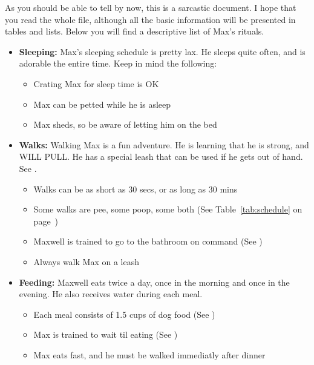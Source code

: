 \documentclass[pdftex,12pt]{article}
\begin{document}
\pagebreak

As you should be able to tell by now, this is a sarcastic document. I hope that
you read the whole file, although all the basic information will be presented in
tables and lists. Below you will find a descriptive list of Max's rituals.
\\

\begin{itemize}\label{itm:schedule}
    \item \textbf{Sleeping:} Max's sleeping schedule is pretty lax. He sleeps 
        quite often, and is adorable the entire time. Keep in mind the following:
        \begin{itemize}
            \item Crating Max for sleep time is OK
            \item Max can be petted while he is asleep
            \item Max sheds, so be aware of letting him on the bed
        \end{itemize}
    \item \textbf{Walks:} Walking Max is a fun adventure. He is learning that he
        is strong, and WILL PULL. He has a special leash that can be used if he 
        gets out of hand. See .
        \begin{itemize}
            \item Walks can be as short as 30 secs, or as long as 30 mins
            \item Some walks are pee, some poop, some both
                  (See Table~\ref{tab:schedule} on page~\pageref{tab:schedule})
            \item Maxwell is trained to go to the bathroom on command
                  (See )
            \item Always walk Max on a leash
        \end{itemize}
    \item \textbf{Feeding:} Maxwell eats twice a day, once in the morning and
        once in the evening. He also receives water during each meal.
        \begin{itemize}
            \item Each meal consists of 1.5 cups of dog food
                  (See )
            \item Max is trained to wait til eating
                  (See )
            \item Max eats fast, and he must be walked immediatly after dinner

\end{itemize}
\end{itemize}
\end{document}
